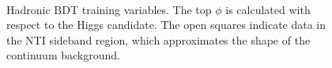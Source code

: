 \begin{figure}[htbp]
	\\ 
  \caption{Hadronic BDT training variables. The top $\phi$ is calculated with respect to the Higgs candidate. The open squares indicate data in the NTI sideband region, which approximates the shape of the continuum background. }
  \label{fig:hadvbls1}
\end{figure}


